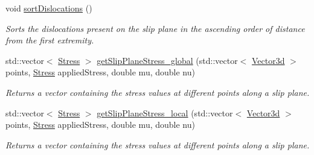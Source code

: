 \begin{DoxyCompactItemize}
void \hyperlink{classSlipPlane_a7fc607c17e5532aed5e93339dc03b18d}{sort\-Dislocations} ()
\begin{DoxyCompactList}\small\item\em \-Sorts the dislocations present on the slip plane in the ascending order of distance from the first extremity. \end{DoxyCompactList}\item 
std\-::vector$<$ \hyperlink{classStress}{\-Stress} $>$ \hyperlink{classSlipPlane_a1cc47e2092a588ff04fd14e9ce9e5906}{get\-Slip\-Plane\-Stress\-\_\-global} (std\-::vector$<$ \hyperlink{classVector3d}{\-Vector3d} $>$ points, \hyperlink{classStress}{\-Stress} applied\-Stress, double mu, double nu)
\begin{DoxyCompactList}\small\item\em \-Returns a vector containing the stress values at different points along a slip plane. \end{DoxyCompactList}\item 
std\-::vector$<$ \hyperlink{classStress}{\-Stress} $>$ \hyperlink{classSlipPlane_ad86337ca356d72f558468a35024e30bc}{get\-Slip\-Plane\-Stress\-\_\-local} (std\-::vector$<$ \hyperlink{classVector3d}{\-Vector3d} $>$ points, \hyperlink{classStress}{\-Stress} applied\-Stress, double mu, double nu)
\begin{DoxyCompactList}\small\item\em \-Returns a vector containing the stress values at different points along a slip plane. \end{DoxyCompactList}\end{DoxyCompactItemize}
